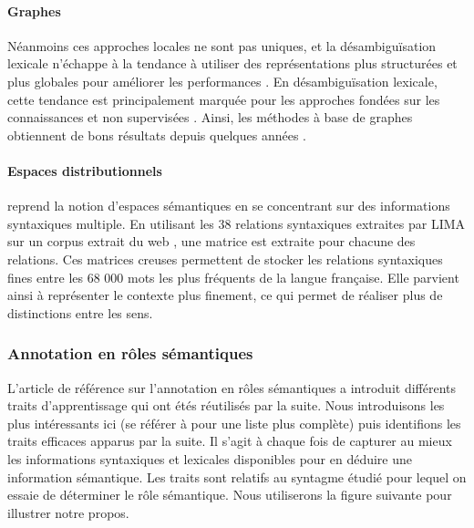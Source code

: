 \paragraph{Graphes}

Néanmoins ces approches locales ne sont pas uniques, et la désambiguïsation lexicale n'échappe à la tendance à utiliser des représentations plus structurées et plus globales pour améliorer les performances \citep{marquez2012special}. En désambiguïsation lexicale, cette tendance est principalement marquée pour les approches fondées sur les connaissances et non supervisées \citep[p~.14]{navigli2009word}. Ainsi, les méthodes à base de graphes \cite{navigli2005semantic,agirre2009personalizing} obtiennent de bons résultats depuis quelques années \citep{navigli2007semeval,ponzetto2010knowledge}. %

\paragraph{Espaces distributionnels}
\label{espacesdistrib}

\cite{mouton2009induction} reprend la notion d'espaces sémantiques \citep{sahlgren2006word} en se concentrant sur des informations syntaxiques multiple. En utilisant les 38 relations syntaxiques extraites par LIMA \citep{besancon2010lima} sur un corpus extrait du web \citep{grefenstette2007conquering}, une matrice est extraite pour chacune des relations. Ces matrices creuses permettent de stocker les relations syntaxiques fines entre les 68 000 mots les plus fréquents de la langue française. Elle parvient ainsi à représenter le contexte plus finement, ce qui permet de réaliser plus de distinctions entre les sens.


\subsubsection{Annotation en rôles sémantiques}

L'article de référence sur l'annotation en rôles sémantiques \citep{gildea2002automatic} a introduit différents traits d'apprentissage qui ont étés réutilisés par la suite. Nous introduisons les plus intéressants ici (se référer à \citep{palmer2010semantic} pour une liste plus complète) puis identifions les traits efficaces apparus par la suite. Il s'agit à chaque fois de capturer au mieux les informations syntaxiques et lexicales disponibles pour en déduire une information sémantique. Les traits sont relatifs au syntagme étudié pour lequel on essaie de déterminer le rôle sémantique. Nous utiliserons la figure suivante pour illustrer notre propos.

